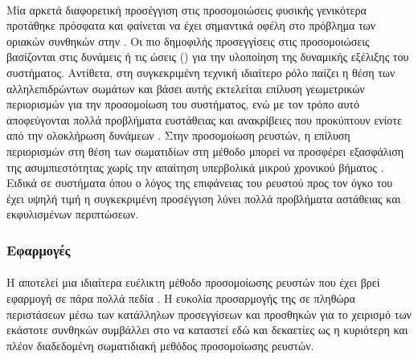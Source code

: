 \paragraph{} Μία αρκετά διαφορετική προσέγγιση στις προσομοιώσεις φυσικής γενικότερα
προτάθηκε πρόσφατα και φαίνεται να έχει σημαντικά οφέλη στο πρόβλημα των οριακών συνθηκών
στην . Οι πιο δημοφιλής προσεγγίσεις στις προσομοιώσεις βασίζονται στις δυνάμεις
ή τις ώσεις () για την υλοποίηση της δυναμικής εξέλιξης του
συστήματος. Αντίθετα, στη συγκεκριμένη τεχνική ιδιαίτερο ρόλο παίζει η θέση των
αλληλεπιδρώντων σωμάτων και βάσει αυτής εκτελείται επίλυση γεωμετρικών περιορισμών για την
προσομοίωση του συστήματος, ενώ με τον τρόπο αυτό αποφεύγονται πολλά προβλήματα ευστάθειας
και ανακρίβειες που προκύπτουν ενίοτε από την ολοκλήρωση δυνάμεων
\cite{Muller2007109}. Στην προσομοίωση ρευστών, η επίλυση περιορισμών στη θέση των
σωματιδίων στη μέθοδο  μπορεί να προσφέρει εξασφάλιση της ασυμπιεστότητας χωρίς
την απαίτηση υπερβολικά μικρού χρονικού βήματος \cite{macklin2013position}. Ειδικά σε
συστήματα όπου ο λόγος της επιφάνειας του ρευστού προς τον όγκο του έχει υψηλή τιμή η
συγκεκριμένη προσέγγιση λύνει πολλά προβλήματα αστάθειας και εκφυλισμένων περιπτώσεων.

\subsubsection{Εφαρμογές}
\paragraph{} Η  αποτελεί μια ιδιαίτερα ευέλικτη μέθοδο προσομοίωσης ρευστών που
έχει βρεί εφαρμογή σε πάρα πολλά πεδία \cite{monaghan2012smoothed}. H ευκολία προσαρμογής
της σε πληθώρα περιστάσεων μέσω των κατάλληλων προσεγγίσεων και προσθηκών για το χειρισμό
των εκάστοτε συνθηκών συμβάλλει στο να καταστεί εδώ και δεκαετίες ως η κυριότερη και πλέον
διαδεδομένη σωματιδιακή μεθόδος προσομοίωσης ρευστών.

